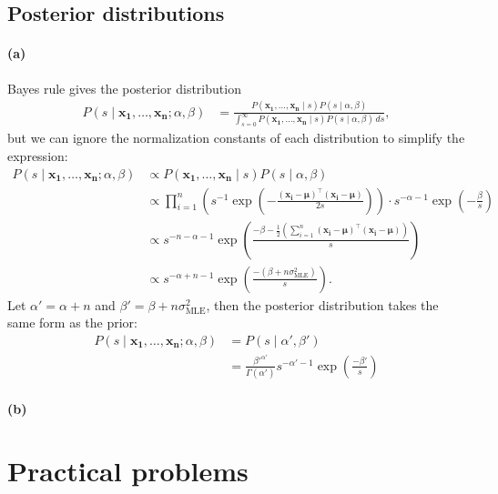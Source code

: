 \documentclass[a4paper,11pt]{article}
\DeclareMathOperator{\given}{\mid}
\begin{document}
\subsection{Posterior distributions}
\paragraph{(a)}Bayes rule gives the posterior distribution
\begin{align*}
  P(s\given \mathbf{x_1},\dots,\mathbf{x_n};\alpha,\beta)
    &=\frac{
        P(\mathbf{x_1},\dots,\mathbf{x_n}\given s)P(s\given\alpha,\beta)
      }{
        \int_{s=0}^\infty P(\mathbf{x_1},\dots,\mathbf{x_n}\given s)P(s\given\alpha,\beta)\,ds
      },
\end{align*}
but we can ignore the normalization constants of each distribution to simplify the expression:
\begin{align*}
  P(s\given \mathbf{x_1},\dots,\mathbf{x_n};\alpha,\beta)
    &\propto P(\mathbf{x_1},\dots,\mathbf{x_n}\given s)P(s\given\alpha,\beta)\\
    &\propto
      \prod_{i=1}^n \left(
        s^{-1}\exp\left(-\frac{(\mathbf{x_i}-\boldsymbol\mu)^\top(\mathbf{x_i}-\boldsymbol\mu)}{2s}\right)
      \right)
      \cdot
      s^{-\alpha-1}\exp\left(-\frac{\beta}{s}\right)\\
    &\propto
      s^{-n-\alpha-1}
      \exp\left(
        \frac{
          -\beta
          -\frac{1}{2}\left(
            \sum_{i=1}^n
              (\mathbf{x_i}-\boldsymbol\mu)^\top(\mathbf{x_i}-\boldsymbol\mu)
          \right)
        }{
          s
        }
      \right)\\
    &\propto
      s^{-{\alpha+n}-1}
      \exp\left(
        \frac{
          -(\beta+n\sigma_\textrm{MLE}^2)
        }{
          s
        }
      \right).
\end{align*}
Let $\alpha'=\alpha+n$ and $\beta'=\beta+n\sigma_\textrm{MLE}^2$, then the posterior distribution takes the same form as the prior:
\begin{align*}
P(s\given \mathbf{x_1},\dots,\mathbf{x_n};\alpha,\beta)
  &=P(s\given\alpha',\beta')\\
  &=\frac{{\beta'}^{\alpha'}}{\Gamma(\alpha')}s^{-\alpha'-1}\exp\left(\frac{-\beta'}{s}\right)
\end{align*}
\paragraph{(b)}
\section{Practical problems}
\end{document}
